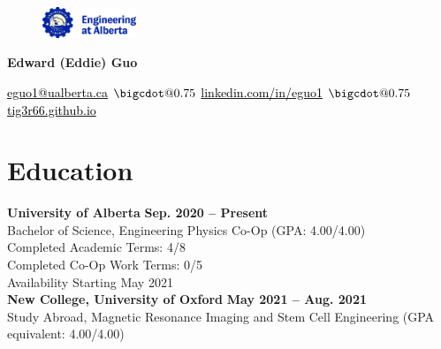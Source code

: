 \documentclass{article}
\makeatletter
\newcommand*\bigcdot{\mathpalette\bigcdot@{0.75}}
\newcommand*\bigcdot@[2]{\mathbin{\vcenter{\hbox{\scalebox{#2}{$\m@th#1\bullet$}}}}}
\makeatother
\begin{document}
\thispagestyle{plain}
\begin{figure} \vspace{-1em}
    \includegraphics[width=0.25\textwidth]{2020_coop_logo.jpeg}
\end{figure}

\LARGE \textbf{\textcolor{my_colour}{Edward (Eddie) Guo}} \vspace{.25em}

\normalfont \normalsize

\href{mailto:eguo1@ualberta.ca}{\textcolor{black}{eguo1@ualberta.ca}}
    \hspace{.15em} $\bigcdot$ \hspace{.15em}
\href{https://www.linkedin.com/in/eguo1}{\textcolor{black}{linkedin.com/in/eguo1}}
    \hspace{.15em} $\bigcdot$ \hspace{.15em}
\href{https://tig3r66.github.io/index.html}{\textcolor{black}{tig3r66.github.io}}

\vspace{-.25em}


\section*{\textcolor{my_colour}{Education}}
\vspace{-.25em} \hrulefill \vspace{.75em}

\textbf{University of Alberta} \hfill \textbf{Sep. 2020 -- Present}\\
Bachelor of Science, Engineering Physics Co-Op (GPA: 4.00/4.00) \\
Completed Academic Terms: 4/8 \\
Completed Co-Op Work Terms: 0/5 \\
Availability Starting May 2021 \\
  

\textbf{New College, University of Oxford} \hfill \textbf{May 2021 -- Aug. 2021}\\
Study Abroad, Magnetic Resonance Imaging and Stem Cell Engineering (GPA equivalent: 4.00/4.00) \\
\end{document}
